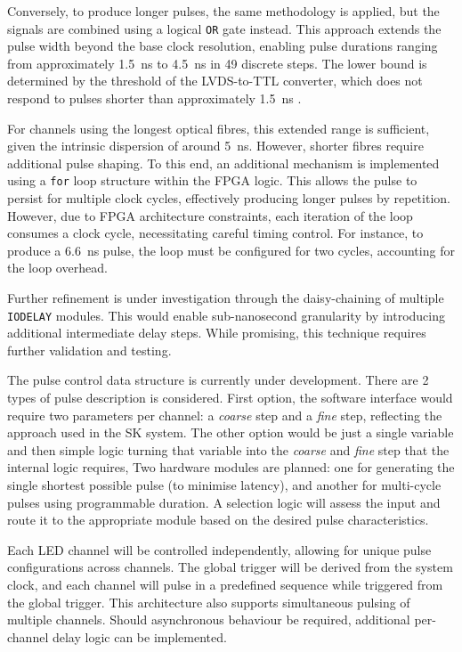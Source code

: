 \documentclass[a4paper,11pt]{article}
\begin{document}
Conversely, to produce longer pulses, the same methodology is applied, but the signals are combined using a logical \texttt{OR} gate instead. This approach extends the pulse width beyond the base clock resolution, enabling pulse durations ranging from approximately \SI{1.5}{\nano\second} to \SI{4.5}{\nano\second} in 49 discrete steps. The lower bound is determined by the threshold of the LVDS-to-TTL converter, which does not respond to pulses shorter than approximately \SI{1.5}{\nano\second} .

For channels using the longest optical fibres, this extended range is sufficient, given the intrinsic dispersion of around \SI{5}{\nano\second}. However, shorter fibres require additional pulse shaping. To this end, an additional mechanism is implemented using a \texttt{for} loop structure within the FPGA logic. This allows the pulse to persist for multiple clock cycles, effectively producing longer pulses by repetition. However, due to FPGA architecture constraints, each iteration of the loop consumes a clock cycle, necessitating careful timing control. For instance, to produce a \SI{6.6}{\nano\second} pulse, the loop must be configured for two cycles, accounting for the loop overhead.

Further refinement is under investigation through the daisy-chaining of multiple \texttt{IODELAY} modules. This would enable sub-nanosecond granularity by introducing additional intermediate delay steps. While promising, this technique requires further validation and testing.

The pulse control data structure is currently under development. There are 2 types of pulse description is considered. First option, the software interface would require two parameters per channel: a \textit{coarse} step and a \textit{fine} step, reflecting the approach used in the SK system. The other option would be just a single variable and then simple logic turning that variable into the \textit{coarse} and \textit{fine} step that the internal logic requires, Two hardware modules are planned: one for generating the single shortest possible pulse (to minimise latency), and another for multi-cycle pulses using programmable duration. A selection logic will assess the input and route it to the appropriate module based on the desired pulse characteristics.

Each LED channel will be controlled independently, allowing for unique pulse configurations across channels. The global trigger will be derived from the system clock, and each channel will pulse in a predefined sequence while triggered from the global trigger. This architecture also supports simultaneous pulsing of multiple channels. Should asynchronous behaviour be required, additional per-channel delay logic can be implemented.
\end{document}
